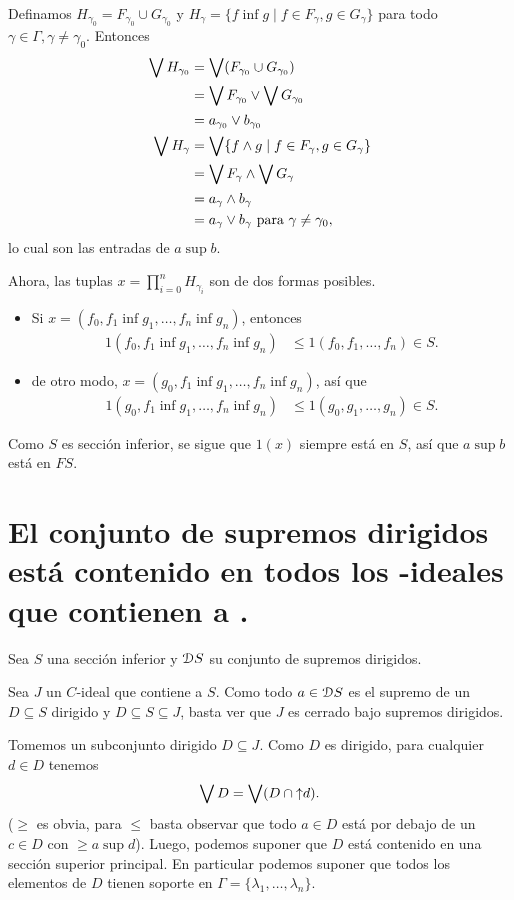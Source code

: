 Definamos $H_{\gamma_0}=F_{\gamma_0}\cup G_{\gamma_0}$ y
$H_\gamma = \{f\inf g\mid f\in F_\gamma,g\in G_\gamma\}$ para
todo $\gamma\in\Gamma,\gamma\neq\gamma_0$.
Entonces
\begin{align*}
  \bigvee H_{\gamma_0}
  &= \bigvee(F_{\gamma_0}\cup G_{\gamma_0}) \\
  &= \bigvee F_{\gamma_0} \vee \bigvee G_{\gamma_0} \\
  &= a_{\gamma_0} \vee b_{\gamma_0}
  \\
  \bigvee H_\gamma
  &= \bigvee\{f\wedge g \mid f\in F_\gamma, g\in G_\gamma\} \\
  &= \bigvee F_\gamma \wedge \bigvee G_\gamma \\
  &= a_\gamma \wedge b_\gamma \\
  &= a_\gamma\vee b_\gamma
  \text{ para } \gamma\neq\gamma_0,
\end{align*}
lo cual son las entradas de $a\sup b$.

Ahora, las tuplas $x=\prod_{i=0}^n H_{\gamma_i}$ son de
dos formas posibles.
\begin{itemize}
  \item Si $x=(f_0,f_1\inf g_1,\dots,f_n\inf g_n)$,
  entonces
  \begin{align*}
    1(f_0,f_1\inf g_1,\dots,f_n\inf g_n)
    &\leq 1(f_0,f_1,\dots,f_n) \in S.
  \end{align*}
  \item de otro modo, $x=(g_0,f_1\inf g_1,\dots,f_n\inf g_n)$,
  así que
  \begin{align*}
    1(g_0,f_1\inf g_1,\dots,f_n\inf g_n)
    &\leq 1(g_0,g_1,\dots,g_n)\in S.
  \end{align*}
\end{itemize}
Como $S$ es sección inferior, se sigue que $1(x)$ siempre está en
$S$, así que $a\sup b$ está en $FS$.

\section{El conjunto de supremos dirigidos  está contenido en todos los -ideales que contienen a .}

Sea $S$ una sección inferior y $\mathcal D S$ su conjunto de supremos
dirigidos.

Sea $J$ un $C$-ideal que contiene a $S$.
Como todo $a\in\mathcal D S$ es el supremo de un $D\subseteq S$ dirigido
y $D\subseteq S\subseteq J$, basta ver que $J$ es cerrado bajo
supremos dirigidos.

Tomemos un subconjunto dirigido $D\subseteq J$.
Como $D$ es dirigido, para cualquier $d\in D$ tenemos
\[
  \bigvee D = \bigvee(D\cap{\uparrow}d)
.\]
($\geq$ es obvia, para $\leq$ basta observar que todo $a\in D$
está por debajo de un $c\in D$ con $\geq a\sup d$).
Luego, podemos suponer que $D$ está contenido en una sección
superior principal.
En particular podemos suponer que todos los elementos de $D$
tienen soporte en $\Gamma=\{\lambda_1,\dots,\lambda_n\}$.


